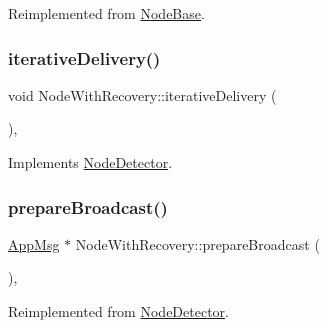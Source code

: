 Reimplemented from \hyperlink{class_node_base_add2450264be5dd616f9f9ac94e83b988}{Node\+Base}.

\mbox{\label{class_node_with_recovery_a9b61912f38b62452584dc80bf261ef4e}} 
\subsubsection{\texorpdfstring{iterative\+Delivery()}{iterativeDelivery()}}
{\footnotesize\ttfamily void Node\+With\+Recovery\+::iterative\+Delivery (\begin{DoxyParamCaption}{ }\end{DoxyParamCaption})\hspace{0.3cm}{\ttfamily [protected]}, {\ttfamily [virtual]}}



Implements \hyperlink{class_node_detector_a17ecf9939fce7471f4513b66185743cc}{Node\+Detector}.

\mbox{\label{class_node_with_recovery_a33d8e8775fd69cb647b38a54b36e1ebe}} 
\subsubsection{\texorpdfstring{prepare\+Broadcast()}{prepareBroadcast()}}
{\footnotesize\ttfamily \hyperlink{class_app_msg}{App\+Msg} $\ast$ Node\+With\+Recovery\+::prepare\+Broadcast (\begin{DoxyParamCaption}{ }\end{DoxyParamCaption})\hspace{0.3cm}{\ttfamily [protected]}, {\ttfamily [virtual]}}



Reimplemented from \hyperlink{class_node_detector_af75cf37cc01fc51bc228a7a83c10cb97}{Node\+Detector}.

\mbox{\label{class_node_with_recovery_a52ef51093d41e9b337987810311a7bc6}} 
